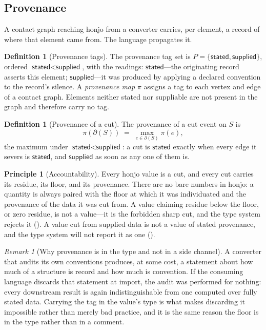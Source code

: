 \documentclass[11pt,twocolumn,a4paper]{article}
\theoremstyle{thmstyle}
\theoremstyle{definition}
\newtheorem{definition}[theorem]{Definition}
\newtheorem{principle}[theorem]{Principle}
\theoremstyle{remark}
\newtheorem{remark}[theorem]{Remark}
\newcommand{\cut}{\partial}
\newcommand{\stated}{\textsf{stated}}
\newcommand{\supplied}{\textsf{supplied}}
\newcommand{\Prov}{\pi}
\begin{document}
\subsection{Provenance}
\label{sec:model-prov}

A contact graph reaching honjo from a converter carries, per element, a
record of where that element came from. The language propagates it.

\begin{definition}[Provenance tags]
\label{def:prov-tags}
The provenance tag set is $P=\{\stated,\supplied\}$, ordered
$\stated<\supplied$, with the readings: $\stated$---the originating
record asserts this element; $\supplied$---it was produced by applying a
declared convention to the record's silence. A \emph{provenance map}
$\Prov$ assigns a tag to each vertex and edge of a contact graph.
Elements neither stated nor suppliable are not present in the graph and
therefore carry no tag.
\end{definition}

\begin{definition}[Provenance of a cut]
\label{def:prov-cut}
The provenance of a cut event on $S$ is
\[
\Prov(\cut(S))\;=\;\max_{e\in\cut(S)}\Prov(e),
\]
the maximum under $\stated<\supplied$: a cut is $\stated$ exactly when
every edge it severs is $\stated$, and $\supplied$ as soon as any one of
them is.
\end{definition}

\begin{principle}[Accountability]
\label{prin:accountability}
Every honjo value is a cut, and every cut carries its residue, its floor,
and its provenance. There are no bare numbers in honjo: a quantity is
always paired with the floor at which it was individuated and the
provenance of the data it was cut from. A value claiming residue below
the floor, or zero residue, is not a value---it is the forbidden sharp
cut, and the type system rejects it (). A value
cut from supplied data is not a value of stated provenance, and the type
system will not report it as one ().
\end{principle}

\begin{remark}[Why provenance is in the type and not in a side channel]
\label{rem:prov-in-type}
A converter that audits its own conventions produces, at some cost, a
statement about how much of a structure is record and how much is
convention. If the consuming language discards that statement at import,
the audit was performed for nothing: every downstream result is again
indistinguishable from one computed over fully stated data. Carrying the
tag in the value's type is what makes discarding it impossible rather
than merely bad practice, and it is the same reason the floor is in the
type rather than in a comment.
\end{remark}
\end{document}
